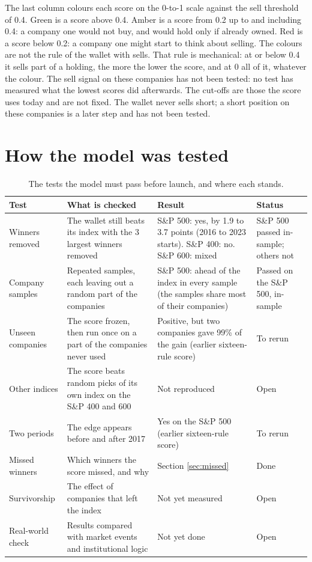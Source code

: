 \documentclass[11pt,a4paper]{article}
\begin{document}
The last column colours each score on the 0-to-1 scale against the sell threshold of 0.4. Green is a score above 0.4. Amber is a score from 0.2 up to and including 0.4: a company one would not buy, and would hold only if already owned. Red is a score below 0.2: a company one might start to think about selling. The colours are not the rule of the wallet with sells. That rule is mechanical: at or below 0.4 it sells part of a holding, the more the lower the score, and at 0 all of it, whatever the colour. The sell signal on these companies has not been tested: no test has measured what the lowest scores did afterwards. The cut-offs are those the score uses today and are not fixed. The wallet never sells short; a short position on these companies is a later step and has not been tested.

\section{How the model was tested}
\label{sec:testing}
\begin{table}[H]
\centering
\small
\caption{The tests the model must pass before launch, and where each stands.}\label{tab:testing}
\begin{tabular}{l p{3.6cm} p{4.6cm} p{2.3cm}}
\hline
Test & What is checked & Result & Status \\
\hline
Winners removed & The wallet still beats its index with the 3 largest winners removed & S\&P 500: yes, by 1.9 to 3.7 points (2016 to 2023 starts). S\&P 400: no. S\&P 600: mixed & S\&P 500 passed in-sample; others not \\
Company samples & Repeated samples, each leaving out a random part of the companies & S\&P 500: ahead of the index in every sample (the samples share most of their companies) & Passed on the S\&P 500, in-sample \\
Unseen companies & The score frozen, then run once on a part of the companies never used & Positive, but two companies gave 99\% of the gain (earlier sixteen-rule score) & To rerun \\
Other indices & The score beats random picks of its own index on the S\&P 400 and 600 & Not reproduced & Open \\
Two periods & The edge appears before and after 2017 & Yes on the S\&P 500 (earlier sixteen-rule score) & To rerun \\
Missed winners & Which winners the score missed, and why & Section \ref{sec:missed} & Done \\
Survivorship & The effect of companies that left the index & Not yet measured & Open \\
Real-world check & Results compared with market events and institutional logic & Not yet done & Open \\
\hline
\end{tabular}
\end{table}
\end{document}
